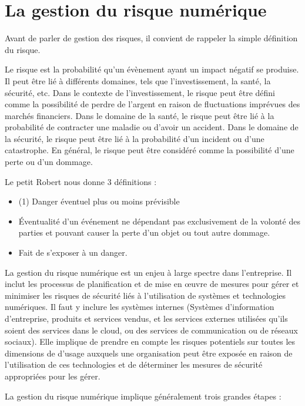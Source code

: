 
\section{La gestion du risque numérique}

Avant de parler de gestion des risques, il convient de rappeler la simple définition du risque.

Le risque est la probabilité qu'un évènement ayant un impact négatif se produise. Il peut être lié à différents domaines, tels que l'investissement, la santé, la sécurité, etc. Dans le contexte de l'investissement, le risque peut être défini comme la possibilité de perdre de l'argent en raison de fluctuations imprévues des marchés financiers. Dans le domaine de la santé, le risque peut être lié à la probabilité de contracter une maladie ou d'avoir un accident. Dans le domaine de la sécurité, le risque peut être lié à la probabilité d'un incident ou d'une catastrophe. En général, le risque peut être considéré comme la possibilité d'une perte ou d'un dommage.

Le petit Robert nous donne 3 définitions :
\begin{itemize}
  \item (1) Danger éventuel plus ou moins prévisible
  \item Éventualité d’un événement ne dépendant pas exclusivement de la volonté des parties et pouvant causer la perte d’un objet ou tout autre dommage.
  \item Fait de s’exposer à un danger.
\end{itemize}



La gestion du risque numérique est un enjeu à large spectre dans l'entreprise. Il inclut les processus de planification et de mise en œuvre de mesures pour gérer et minimiser les risques de sécurité liés à l'utilisation de systèmes et technologies numériques. Il faut y inclure les systèmes internes (Systèmes d'information d'entreprise, produits et services vendus, et les services externes utilisées qu'ils soient des services dans le cloud, ou des services de communication ou de réseaux sociaux).
Elle implique de prendre en compte les risques potentiels sur toutes les dimensions de d'usage auxquels une organisation peut être exposée en raison de l'utilisation de ces technologies  et de déterminer les mesures de sécurité appropriées pour les gérer.

La gestion du risque numérique implique généralement trois grandes étapes :


